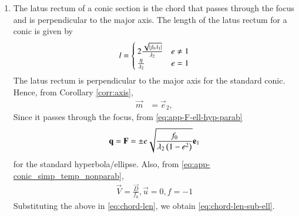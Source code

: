 \begin{enumerate}[label=\thesubsection.\arabic*.,ref=\thesubsection.\theenumi]
		\begin{proof}
From		\eqref{corr:axis}, the major/symmetry axis for the hyperbola/ellipse/parabola can be expressed using 
	\eqref{eq:conic_affine}
 as
  \begin{align}
	  \vec{e}_2^{\top}
		  \vec{P}^{\top}\brak{\vec{x}-\vec{c}} &= 0
		  \\
	  \implies 		  \brak{\vec{P}\vec{e}_2}^{\top}\brak{\vec{x}-\vec{c}} &= 0
  \end{align}
yielding	  \eqref{eq:app-major-minor-axis-quad}, and the proof for the minor axis is similar.
		\end{proof}
\item
    The latus rectum of a conic section is the chord that passes through the focus and is perpendicular to the major axis.
	The length of the latus rectum for a conic is given by
		\begin{align}
			l =
			\begin{cases}
				2\frac{\sqrt{\left\vert f_0\lambda_1\right\vert}}{\lambda_2} & e \ne 1
			\\
			\frac{\eta}{\lambda_2} & e = 1
			\end{cases}
			\label{eq:app-latus-ellipse}
		\end{align}
		\label{app:latus}
		\solution
			The latus rectum is perpendicular to the major axis for the standard conic.  Hence, from Corollary  
		\eqref{corr:axis},
  \begin{align}
  \vec{m}&= \vec{e}_2,  
\end{align}  
Since it passes through the focus, from 
					\eqref{eq:app-F-ell-hyp-parab}
  \begin{align}
	  \mathbf{q} =			\mathbf{F} 
=
					 \pm e\sqrt{\frac{f_0}{\lambda_2\left(1-e^2\right)}} \mathbf{e }_1
\end{align}  
for the standard hyperbola/ellipse.  Also, 
from 
    \eqref{eq:app-conic_simp_temp_nonparab},
  \begin{align}
	  \vec{V} =     \frac{\vec{D} }{f_0}, 
	   \vec{u} = 0, 
	   f = -1
	    \label{eq:latus_rectum_ellipse_param-new}
\end{align}  
Substituting the above in
\eqref{eq:chord-len}, 
we obtain
\eqref{eq:chord-len-sub-ell}.
\begin{figure*}[!t]
\begin{align}

\end{align}
\end{figure*}
\end{enumerate}
